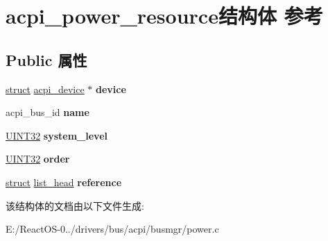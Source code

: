 \hypertarget{structacpi__power__resource}{}\section{acpi\+\_\+power\+\_\+resource结构体 参考}
\label{structacpi__power__resource}
\subsection*{Public 属性}
\begin{DoxyCompactItemize}
\item 
\mbox{\label{structacpi__power__resource_a0739aba0f9bd4ff2b26a232a6b14490b}} 
\hyperlink{interfacestruct}{struct} \hyperlink{structacpi__device}{acpi\+\_\+device} $\ast$ {\bfseries device}
\item 
\mbox{\label{structacpi__power__resource_a6b1d21ba6e5984c827fd8738fc58903d}} 
acpi\+\_\+bus\+\_\+id {\bfseries name}
\item 
\mbox{\label{structacpi__power__resource_a90a8c2ec9cecafb8011cf5b4d841e0ae}} 
\hyperlink{_processor_bind_8h_ae1e6edbbc26d6fbc71a90190d0266018}{U\+I\+N\+T32} {\bfseries system\+\_\+level}
\item 
\mbox{\label{structacpi__power__resource_a7ab2d183496db893003d10e53985a76e}} 
\hyperlink{_processor_bind_8h_ae1e6edbbc26d6fbc71a90190d0266018}{U\+I\+N\+T32} {\bfseries order}
\item 
\mbox{\label{structacpi__power__resource_af0c2cb8e4fa7f15e29fb54800841d108}} 
\hyperlink{interfacestruct}{struct} \hyperlink{structlist__head}{list\+\_\+head} {\bfseries reference}
\end{DoxyCompactItemize}


该结构体的文档由以下文件生成\+:\begin{DoxyCompactItemize}
\item 
E\+:/\+React\+O\+S-\/0../drivers/bus/acpi/busmgr/power.\+c\end{DoxyCompactItemize}
